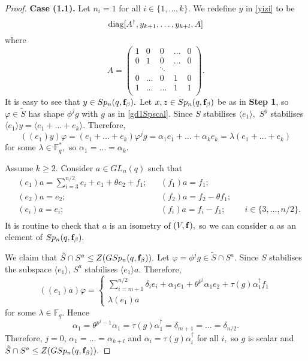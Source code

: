 \begin{proof}
\medskip

{\bf Case (1.1).} Let $n_i=1$ for all $i \in \{1, \ldots, k\}$.
We redefine $y$ in \eqref{yizi} to be
$$\mathrm{diag} [A^{\dagger}, y_{k+1}, \ldots, y_{k+l}, A]$$
where $$
A=
\begin{pmatrix}
1 & 0   & 0   & \ldots  & 0 \\
0 & 1      & 0   & \ldots  & 0 \\
  &        & \ddots &   &  \\
0 & \ldots & 0      & 1 & 0\\
1 & \ldots & \ldots & 1 & 1\\
\end{pmatrix}.
$$ It is easy to see that $y \in Sp_n{(q, {\bf f}_{\beta})}.$ Let $x,z \in Sp_n{(q, {\bf f}_{\beta})}$
be as in {\bf Step 1}, so $\varphi \in \tilde{S}$ has shape $\phi^j g$ with $g$ as in \eqref{gd1Spscal}. Since $S$ stabilises $\langle e_1 \rangle,$ $S^y$ stabilises $\langle e_1 \rangle y= \langle e_1 + \ldots + e_k \rangle.$ Therefore, 
$$((e_1)y)\varphi = (e_1 + \ldots + e_k)\varphi^j g = \alpha_1 e_1 + \ldots + \alpha_k e_k= \lambda(e_1 + \ldots + e_k)$$
for some $\lambda \in \mathbb{F}_q^*,$ so $\alpha_1 = \ldots = \alpha_k.$


Assume $k \ge 2.$ 
Consider $a \in GL_n(q)$ such that
\begin{equation*}
\begin{aligned}
&(e_1)a =\sum_{i=3}^{n/2} e_i +e_1 + \theta e_2 + {f_1};& & (f_1)a=f_1; \\
&(e_{2})a =  e_2; & &(f_{2})a=f_{2} - \theta f_1; & &   \\
&(e_{i})a =e_{i};  & &(f_{i})a=f_{i} -  f_{1}; && i\in \{3, \ldots, n/2 \}.   \\
\end{aligned}
\end{equation*}
 It is routine to check that $a$ is an isometry of $(V, {\bf f}),$ so we can consider $a$ as an element of $Sp_n(q, {\bf f}_{\beta}).$

We claim that $\tilde{S} \cap S^a \le Z(GSp_n(q,{\bf f}_{\beta})).$ Let $\varphi =\phi^j g \in \tilde{S} \cap S^a$.  Since $S$ stabilises the subspace $\langle e_1 \rangle$,  $S^a$ stabilises $\langle e_1 \rangle a.$  Therefore, 
\begin{equation*}
((e_1)a)\varphi=
\begin{cases}
\sum_{i=m+1}^{n/2}\delta_i e_i +\alpha_1e_1 + \theta^{p^j} \alpha_1 e_2+ \tau(g)\alpha_1^{\dagger}f_1\\
\lambda (e_1)a
\end{cases}
\end{equation*}
for some $\lambda \in \mathbb{F}_q.$
Hence 
$$\alpha_1=\theta^{p^j-1}\alpha_1=\tau(g)\alpha_1^{\dagger}=\delta_{m+1}= \ldots= \delta_{n/2}.$$
Therefore, $j=0$,  $\alpha_1= \ldots = \alpha_{k+l}$ and $\alpha_i=\tau(g)\alpha_i^{\dagger}$ for all $i,$ so $g$ is scalar  and $\tilde{S} \cap S^a \le Z(GSp_n(q,{\bf f}_{\beta})).$



\end{proof}
